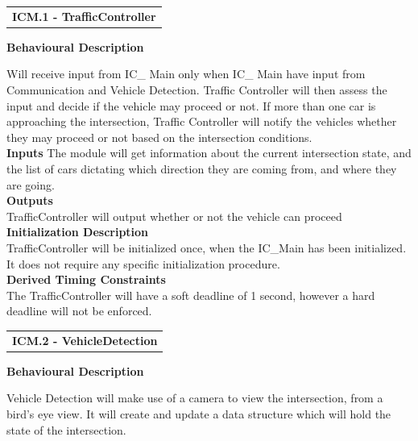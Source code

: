 \documentclass [10pt]{article}
\begin{document}
\begin{longtable}{p{}}
\rowcolor{tableCell}\textbf{ICM.1 - TrafficController} \\
\end{longtable}



\textbf{Behavioural Description} 

Will receive input from IC\_ Main only when IC\_ Main have input from Communication and Vehicle Detection. Traffic Controller will then assess the input and decide if the vehicle may proceed or not. If more than one car is approaching the intersection, Traffic Controller will notify the vehicles whether they may proceed or not based on the intersection conditions.  \\

\textbf{Inputs}
The module will get information about the current intersection state, and the list of cars dictating which direction they are coming from, and where they are going. \\


\textbf{Outputs} \\
TrafficController will output whether or not the vehicle can proceed 
 \\

\textbf{Initialization Description} \\
 TrafficController will be initialized once, when the IC\_Main has been initialized. It does not require any specific initialization procedure.\\

\textbf{Derived Timing Constraints} \\
    The TrafficController will have a soft deadline of 1 second, however a hard deadline will not be enforced.
 \\


\begin{longtable}{p{}}
\rowcolor{tableCell}\textbf{ICM.2 - VehicleDetection} \\
\end{longtable}

\textbf{Behavioural Description} 

Vehicle Detection will make use of a camera to view the intersection, from a bird's eye view. It will create and update a data structure which will hold the state of the intersection.  \\
\end{document}
